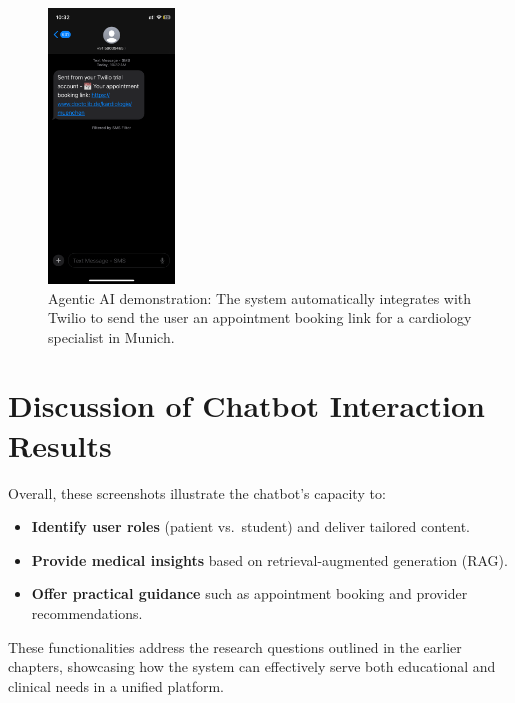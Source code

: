 \begin{figure}[H]
  \centering
  \includegraphics[width=0.3\textwidth]{Images/appointmentlink.png}
  \caption{Agentic AI demonstration: The system automatically integrates with Twilio 
    to send the user an appointment booking link for a cardiology specialist in Munich.}
  \label{fig:agentic_ai_booking}
\end{figure}

\section{Discussion of Chatbot Interaction Results}
Overall, these screenshots illustrate the chatbot’s capacity to:
\begin{itemize}
    \item \textbf{Identify user roles} (patient vs.\ student) and deliver tailored content.
    \item \textbf{Provide medical insights} based on retrieval-augmented generation (RAG).
    \item \textbf{Offer practical guidance} such as appointment booking and provider recommendations.
\end{itemize}

These functionalities address the research questions outlined in the earlier chapters, showcasing how the system can effectively serve both educational and clinical needs in a unified platform.

\clearpage
